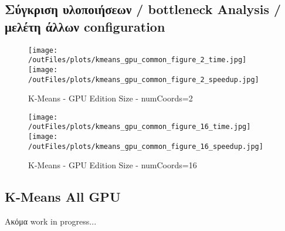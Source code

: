 \documentclass[../final_report.tex]{subfiles}
\begin{document}
\subsection{Σύγκριση υλοποιήσεων / bottleneck Analysis / μελέτη άλλων configuration}

\begin{figure}[H]
    \centering
    \texttt{[image: /outFiles/plots/kmeans\_gpu\_common\_figure\_2\_time.jpg]}
    \texttt{[image: /outFiles/plots/kmeans\_gpu\_common\_figure\_2\_speedup.jpg]}
    \caption{K-Means - GPU Edition Size - numCoords=2}
    \label{fig:K-Means - GPU Edition - {Size:256Mb, numCoords:2, numClusters:16}}
\end{figure}

\begin{figure}[H]
    \centering
    \texttt{[image: /outFiles/plots/kmeans\_gpu\_common\_figure\_16\_time.jpg]}
    \texttt{[image: /outFiles/plots/kmeans\_gpu\_common\_figure\_16\_speedup.jpg]}
    \caption{K-Means - GPU Edition Size - numCoords=16}
    \label{fig:K-Means - GPU Edition - {Size:256Mb, numCoords:16, numClusters:16}}
\end{figure}



\subsection{K-Means All GPU}
Ακόμα work in progress...
\end{document}

